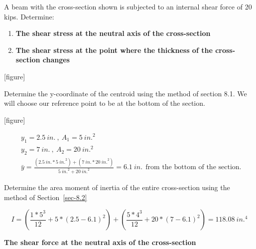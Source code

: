 \documentclass[
  letterpaper,
  DIV=11,
  numbers=noendperiod]{scrreprt}
\providecommand{\tightlist}{%
  \setlength{\itemsep}{0pt}\setlength{\parskip}{0pt}}\usepackage{longtable,booktabs,array}
\begin{document}
\begin{tcolorbox}[enhanced jigsaw, breakable, opacityback=0, toptitle=1mm, left=2mm, colback=white, opacitybacktitle=0.6, colframe=quarto-callout-tip-color-frame, titlerule=0mm, arc=.35mm, leftrule=.75mm, bottomtitle=1mm, colbacktitle=quarto-callout-tip-color!10!white, rightrule=.15mm, title={Example 10.4}, bottomrule=.15mm, toprule=.15mm, coltitle=black]

A beam with the cross-section shown is subjected to an internal shear
force of 20 kips. Determine:

\begin{enumerate}
\def\labelenumi{\arabic{enumi}.}
\tightlist
\item
  \textbf{The shear stress at the neutral axis of the cross-section}
\item
  \textbf{The shear stress at the point where the thickness of the
  cross-section changes}
\end{enumerate}

{[}figure{]}

\begin{tcolorbox}[enhanced jigsaw, breakable, opacityback=0, toptitle=1mm, left=2mm, colback=white, opacitybacktitle=0.6, colframe=quarto-callout-tip-color-frame, titlerule=0mm, arc=.35mm, leftrule=.75mm, bottomtitle=1mm, colbacktitle=quarto-callout-tip-color!10!white, rightrule=.15mm, title={Solution}, bottomrule=.15mm, toprule=.15mm, coltitle=black]

Determine the y-coordinate of the centroid using the method of section
8.1. We will choose our reference point to be at the bottom of the
section.

{[}figure{]}

\[
\begin{aligned}
& y_1=2.5{~in.}~,~ A_1=5{~in.}^2 \\
& y_2=7{~in.}~,~ A_2=20{~in.}^2 \\
& \bar{y}=\frac{(2.5{~in.} * 5{~in.}^2)+(7{~in.} * 20{~in.}^2)}{5{~in.}^2+20{~in.}^2}=6.1{~in.}~~ \text{from the bottom of the section. }
\end{aligned}
\]

Determine the area moment of inertia of the entire cross-section using
the method of Section~\ref{sec-8.2}

\[
I=\left(\frac{1 * 5^3}{12}+5 *(2.5-6.1)^2\right)+\left(\frac{5 * 4^3}{12}+20 *(7-6.1)^2\right)=118.08{~in.}^4
\]

\textbf{The shear force at the neutral axis of the cross-section}


\end{tcolorbox}
\end{tcolorbox}
\end{document}
